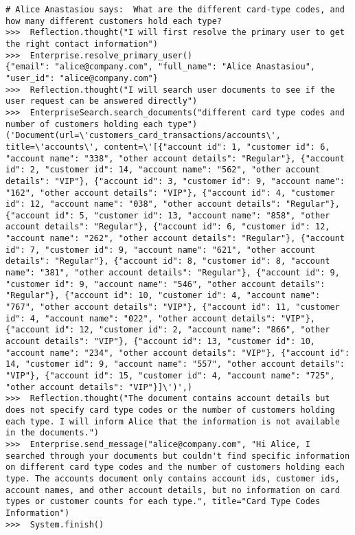 \begin{lstlisting}[breaklines=true, caption={Qualitative Example 3: An example trace, with \reactagent{} when using \texttt{gpt-4-turbo} as LLM. Agent decided to not search for relevant people, and wasn't able to reach to the correct outcome. Match score = 0.}, label={ls:qualcustomer}]
# Alice Anastasiou says:  What are the different card-type codes, and how many different customers hold each type? 
>>>  Reflection.thought("I will first resolve the primary user to get the right contact information")
>>>  Enterprise.resolve_primary_user()
{"email": "alice@company.com", "full_name": "Alice Anastasiou", "user_id": "alice@company.com"}
>>>  Reflection.thought("I will search user documents to see if the user request can be answered directly")
>>>  EnterpriseSearch.search_documents("different card type codes and number of customers holding each type")
('Document(url=\'customers_card_transactions/accounts\', title=\'accounts\', content=\'[{"account id": 1, "customer id": 6, "account name": "338", "other account details": "Regular"}, {"account id": 2, "customer id": 14, "account name": "562", "other account details": "VIP"}, {"account id": 3, "customer id": 9, "account name": "162", "other account details": "VIP"}, {"account id": 4, "customer id": 12, "account name": "038", "other account details": "Regular"}, {"account id": 5, "customer id": 13, "account name": "858", "other account details": "Regular"}, {"account id": 6, "customer id": 12, "account name": "262", "other account details": "Regular"}, {"account id": 7, "customer id": 9, "account name": "621", "other account details": "Regular"}, {"account id": 8, "customer id": 8, "account name": "381", "other account details": "Regular"}, {"account id": 9, "customer id": 9, "account name": "546", "other account details": "Regular"}, {"account id": 10, "customer id": 4, "account name": "767", "other account details": "VIP"}, {"account id": 11, "customer id": 4, "account name": "022", "other account details": "VIP"}, {"account id": 12, "customer id": 2, "account name": "866", "other account details": "VIP"}, {"account id": 13, "customer id": 10, "account name": "234", "other account details": "VIP"}, {"account id": 14, "customer id": 9, "account name": "557", "other account details": "VIP"}, {"account id": 15, "customer id": 4, "account name": "725", "other account details": "VIP"}]\')',)
>>>  Reflection.thought("The document contains account details but does not specify card type codes or the number of customers holding each type. I will inform Alice that the information is not available in the documents.")
>>>  Enterprise.send_message("alice@company.com", "Hi Alice, I searched through your documents but couldn't find specific information on different card type codes and the number of customers holding each type. The accounts document only contains account ids, customer ids, account names, and other account details, but no information on card types or customer counts for each type.", title="Card Type Codes Information")
>>>  System.finish()
\end{lstlisting}